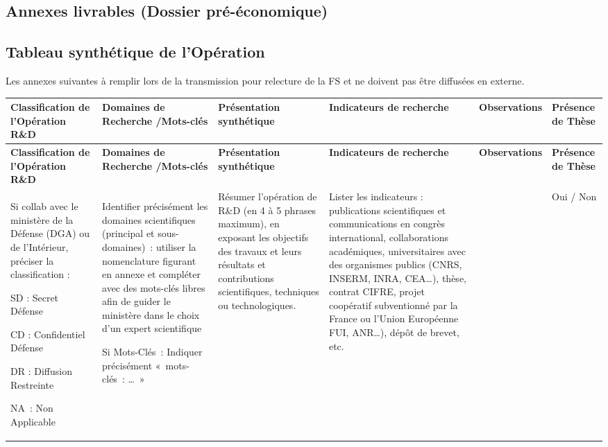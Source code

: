 \documentclass[11pt,a4paper]{article}
\begin{document}
\clearpage
\begin{landscape}
\section{Annexes livrables (Dossier pré-économique)}

\subsection{Tableau synthétique de l’Opération }


Les annexes suivantes à remplir lors de la transmission pour relecture de la FS et ne doivent pas être diffusées en externe.

\begingroup\scriptsize
\setlength{\tabcolsep}{3pt}
\begin{longtable}{|>{\raggedright\arraybackslash}p{2.0cm}|>{\raggedright\arraybackslash}p{4.0cm}|>{\raggedright\arraybackslash}p{7.7cm}|>{\raggedright\arraybackslash}p{6.2cm}|>{\raggedright\arraybackslash}p{1.9cm}|>{\raggedright\arraybackslash}p{1.8cm}|}
\hline
\rowcolor{TableHead} \textbf{Classification de l'Opération R\&D} & \textbf{Domaines de Recherche /Mots-clés} & \textbf{Présentation synthétique} & \textbf{Indicateurs de recherche} & \textbf{Observations} & \textbf{Présence de Thèse} \\ \hline
\endfirsthead
\rowcolor{TableHead} \textbf{Classification de l'Opération R\&D} & \textbf{Domaines de Recherche /Mots-clés} & \textbf{Présentation synthétique} & \textbf{Indicateurs de recherche} & \textbf{Observations} & \textbf{Présence de Thèse} \\ \hline
\endhead
Si collab avec le ministère de la Défense (DGA) ou de l’Intérieur, préciser la classification :\par SD : Secret Défense\par CD : Confidentiel Défense\par DR : Diffusion Restreinte\par NA~: Non Applicable & Identifier précisément les domaines scientifiques (principal et sous-domaines)~: utiliser la nomenclature figurant en annexe et compléter avec des mots-clés libres afin de guider le ministère dans le choix d’un expert scientifique\par Si Mots-Clés~: Indiquer précisément «~mots-clés~: …~»  & Résumer l’opération de R\&D (en 4 à 5 phrases maximum), en exposant les objectifs des travaux et leurs résultats et contributions scientifiques, techniques ou technologiques. & Lister les indicateurs : publications scientifiques et communications en congrès international, collaborations académiques, universitaires avec des organismes publics (CNRS, INSERM, INRA, CEA…), thèse, contrat CIFRE, projet coopératif subventionné par la France ou l’Union Européenne  FUI, ANR…), dépôt de brevet, etc. &  & Oui / Non \\ \hline

\end{longtable}
\end{landscape}
\end{document}
